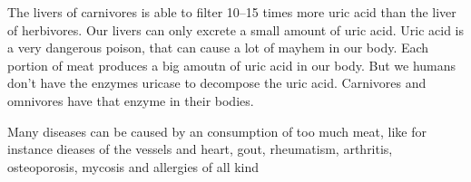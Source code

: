 \documentclass[../main.tex]{subfiles}
\begin{document}
The livers of carnivores is able to filter 10--15 times more uric acid than the liver of herbivores.
Our livers can only excrete a small amount of uric acid.
Uric acid is a very dangerous poison, that can cause a lot of mayhem in our body.
Each portion of meat produces a big amoutn of uric acid in our body.
But we humans don't have the enzymes uricase to decompose the uric acid.
Carnivores and omnivores have that enzyme in their bodies.

Many diseases can be caused by an consumption of too much meat,
like for instance dieases of the vessels and heart,
gout, rheumatism, arthritis, osteoporosis,
mycosis and allergies of all kind
\end{document}
